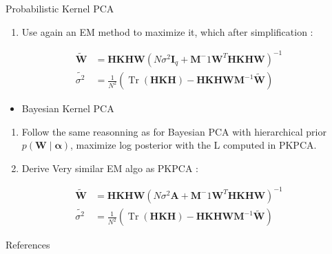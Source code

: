 \documentclass[fleqn]{beamer}
\begin{document}
\begin{frame}{Probabilistic Kernel PCA}
    
    \begin{enumerate}[3]
        \item Use again an EM method to maximize it, which after simplification : 
    \end{enumerate}

    \begin{equation*}
         \begin{aligned}       
        \widetilde{ \mathbf{W}} &= \mathbf{H} \mathbf{K} \mathbf{H} \mathbf{W} (N \sigma^2 \mathbf{I}_q + \mathbf{M}^-1 \mathbf{W}^T \mathbf{H} \mathbf{K} \mathbf{H} \mathbf{W})^{-1} \\
    \widetilde{ \sigma^2 } &= \frac{1}{N^2} ( \operatorname{Tr}(\mathbf{H} \mathbf{K} \mathbf{H}) - \mathbf{H} \mathbf{K} \mathbf{H} \mathbf{W} \mathbf{M}^{-1} \widetilde{ \mathbf{W}} )
\end{aligned}
    \end{equation*}

    \pause

    \begin{itemize}
        \item Bayesian Kernel PCA
    \end{itemize}
    \begin{enumerate}
        \item Follow the same reasonning as for Bayesian PCA with hierarchical prior $p(\mathbf{W} \mid \mathbf{\alpha})$, maximize log posterior with the L computed in PKPCA.
        \item Derive Very similar EM algo as PKPCA : 
    \end{enumerate}

    \begin{equation*}
        \begin{aligned}
            \widetilde{ \mathbf{W}} &= \mathbf{H} \mathbf{K} \mathbf{H} \mathbf{W} (N \sigma^2 \mathbf{A} + \mathbf{M}^-1 \mathbf{W}^T \mathbf{H} \mathbf{K} \mathbf{H} \mathbf{W} )^{-1} \\
            \widetilde{ \sigma^2 } &= \frac{1}{N^2} ( \operatorname{Tr}(\mathbf{H} \mathbf{K} \mathbf{H}) - \mathbf{H} \mathbf{K} \mathbf{H} \mathbf{W} \mathbf{M}^{-1} \widetilde{ \mathbf{W}} )
        \end{aligned}
        \label{em_pkpca}
    \end{equation*}

\end{frame}


\begin{frame}{References}
   \printbibliography
\end{frame}
\end{document}
